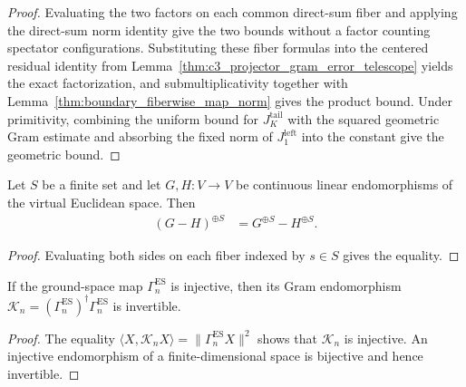 \begin{proof}
    \leanok
    Evaluating the two factors on each common direct-sum fiber and applying the
    direct-sum norm identity give the two bounds without a factor counting
    spectator configurations.  Substituting these fiber formulas into the
    centered residual identity from
    Lemma~\ref{thm:c3_projector_gram_error_telescope} yields the exact
    factorization, and submultiplicativity together with
    Lemma~\ref{thm:boundary_fiberwise_map_norm} gives the product bound.
    Under primitivity, combining the uniform bound for
    $J^{\mathrm{tail}}_K$ with the squared geometric Gram estimate and
    absorbing the fixed norm of $J^{\mathrm{left}}_1$ into the constant give
    the geometric bound.
\end{proof}

\begin{lemma}
    \label{thm:boundary_fiberwise_map_sub}
    \leanok
    Let $S$ be a finite set and let $G,H\colon V\to V$ be continuous linear
    endomorphisms of the virtual Euclidean space.  Then
    \begin{align}
        (G-H)^{\oplus S} & =G^{\oplus S}-H^{\oplus S}.
    \end{align}
\end{lemma}

\begin{proof}
    \leanok
    Evaluating both sides on each fiber indexed by $s\in S$ gives the equality.
\end{proof}

\begin{lemma}
    \label{thm:ground_space_gram_is_unit_of_injective}
    \leanok
    If the ground-space map $\Gamma_n^{\mathrm{ES}}$ is injective, then its Gram
    endomorphism $\mathcal K_n=(\Gamma_n^{\mathrm{ES}})^\dagger
        \Gamma_n^{\mathrm{ES}}$ is invertible.
\end{lemma}

\begin{proof}
    \leanok
    The equality
    $\langle X,\mathcal K_nX\rangle=\lVert\Gamma_n^{\mathrm{ES}}X\rVert^2$
    shows that $\mathcal K_n$ is injective.  An injective endomorphism of a
    finite-dimensional space is bijective and hence invertible.
\end{proof}

